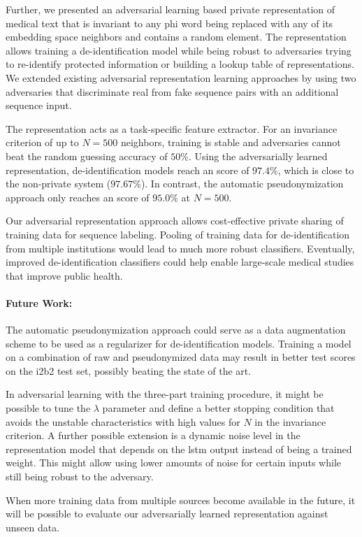 %
Further, we presented an adversarial learning based private representation of medical text that is invariant to any \ac{phi} word being replaced with any of its embedding space neighbors and contains a random element.
%
The representation allows training a de-identification model while being robust to adversaries trying to re-identify protected information or building a lookup table of representations.
%
We extended existing adversarial representation learning approaches by using two adversaries that discriminate real from fake sequence pairs with an additional sequence input.

%
The representation acts as a task-specific feature extractor.
%
For an invariance criterion of up to $N=500$ neighbors, training is stable and adversaries cannot beat the random guessing accuracy of $50\%$.
%
Using the adversarially learned representation, de-identification models reach an \fone score of $97.4\%$, which is close to the non-private system (\(97.67\%\)).
In contrast, the automatic pseudonymization approach only reaches an \fone score of \(95.0\%\) at \(N = 500\).
%
% 

%
Our adversarial representation approach allows cost-effective private sharing of training data for sequence labeling. Pooling of training data for de-identification from multiple institutions would lead to much more robust classifiers.
%
Eventually, improved de-identification classifiers could help enable large-scale medical studies that improve public health.

%
\paragraph{Future Work:} The automatic pseudonymization approach could serve as a data augmentation scheme to be used as a regularizer for de-identification models.
%
Training a model on a combination of raw and pseudonymized data may result in better test scores on the i2b2 test set, possibly beating the state of the art.

%
In adversarial learning with the three-part training procedure, it might be possible to tune the $\lambda$ parameter and define a better stopping condition that avoids the unstable characteristics with high values for $N$ in the invariance criterion.
%
A further possible extension is a dynamic noise level in the representation model that depends on the \ac{lstm} output instead of being a trained weight.
%
This might allow using lower amounts of noise for certain inputs while still being robust to the adversary.


%
When more training data from multiple sources become available in the future, it will be possible to evaluate our adversarially learned representation against unseen data.


